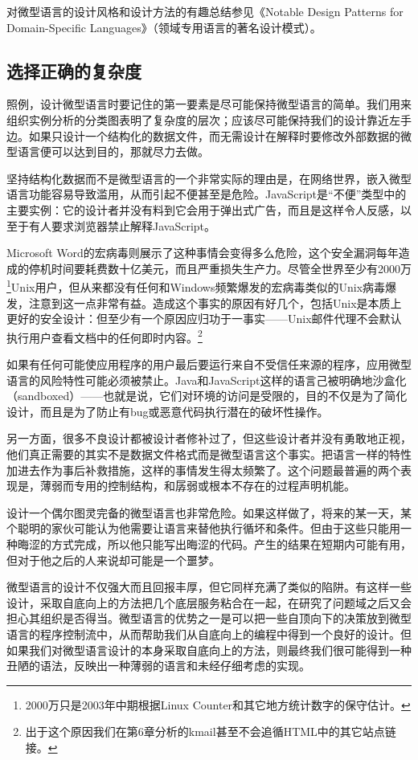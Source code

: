 \documentclass[12pt,oneside]{book}
\begin{document}
\begin{common-format}
对微型语言的设计风格和设计方法的有趣总结参见《Notable Design Patterns for Domain-Specific Languages》（领域专用语言的著名设计模式）\cite{Spinellis}。


\subsection{选择正确的复杂度}
照例，设计微型语言时要记住的第一要素是尽可能保持微型语言的简单。我们用来组织实例分析的分类图表明了复杂度的层次；应该尽可能保持我们的设计靠近左手边。如果只设计一个结构化的数据文件，而无需设计在解释时要修改外部数据的微型语言便可以达到目的，那就尽力去做。

坚持结构化数据而不是微型语言的一个非常实际的理由是，在网络世界，嵌入微型语言功能容易导致滥用，从而引起不便甚至是危险。JavaScript是“不便”类型中的主要实例：它的设计者并没有料到它会用于弹出式广告，而且是这样令人反感，以至于有人要求浏览器禁止解释JavaScript。

Microsoft Word的宏病毒则展示了这种事情会变得多么危险，这个安全漏洞每年造成的停机时间要耗费数十亿美元，而且严重损失生产力。尽管全世界至少有2000万\footnote{2000万只是2003年中期根据Linux Counter和其它地方统计数字的保守估计。}Unix用户，但从来都没有任何和Windows频繁爆发的宏病毒类似的Unix病毒爆发，注意到这一点非常有益。造成这个事实的原因有好几个，包括Unix是本质上更好的安全设计：但至少有一个原因应归功于一事实——Unix邮件代理不会默认执行用户查看文档中的任何即时内容。\footnote{出于这个原因我们在第6章分析的kmail甚至不会追循HTML中的其它站点链接。}

如果有任何可能使应用程序的用户最后要运行来自不受信任来源的程序，应用微型语言的风险特性可能必须被禁止。Java和JavaScript这样的语言己被明确地沙盒化（sandboxed）——也就是说，它们对环境的访问是受限的，目的不仅是为了简化设计，而且是为了防止有bug或恶意代码执行潜在的破坏性操作。

另一方面，很多不良设计都被设计者修补过了，但这些设计者并没有勇敢地正视，他们真正需要的其实不是数据文件格式而是微型语言这个事实。把语言一样的特性加进去作为事后补救措施，这样的事情发生得太频繁了。这个问题最普遍的两个表现是，薄弱而专用的控制结构，和孱弱或根本不存在的过程声明机能。

设计一个偶尔图灵完备的微型语言也非常危险。如果这样做了，将来的某一天，某个聪明的家伙可能认为他需要让语言来替他执行循坏和条件。但由于这些只能用一种晦涩的方式完成，所以他只能写出晦涩的代码。产生的结果在短期内可能有用，但对于他之后的人来说却可能是一个噩梦。

微型语言的设计不仅强大而且回报丰厚，但它同样充满了类似的陷阱。有这样一些设计，采取自底向上的方法把几个底层服务粘合在一起，在研究了问题域之后又会担心其组织是否得当。微型语言的优势之一是可以把一些自顶向下的决策放到微型语言的程序控制流中，从而帮助我们从自底向上的编程中得到一个良好的设计。但如果我们对微型语言设计的本身采取自底向上的方法，则最终我们很可能得到一种丑陋的语法，反映出一种薄弱的语言和未经仔细考虑的实现。


\end{common-format}
\end{document}
